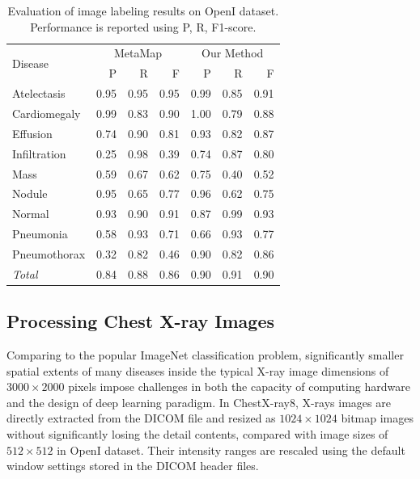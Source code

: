 \documentclass[10pt,twocolumn,letterpaper]{article}
\begin{document}
%
\begin{table}
	\begin{center}
		\begin{tabular}{lr@{~/~}r@{~/~}rr@{~/~}r@{~/~}r}
			\hline
			\multirow{2}{*}{Disease} & \multicolumn{3}{c}{MetaMap} & \multicolumn{3}{c}{Our Method}\\\cline{2-7}
			& P & R & F & P & R & F\\\hline\hline
			Atelectasis & 0.95 & 0.95 & 0.95 & 0.99 & 0.85 & 0.91\\
			Cardiomegaly & 0.99 & 0.83 & 0.90 & 1.00 & 0.79 & 0.88\\
			Effusion & 0.74 & 0.90 & 0.81 & 0.93 & 0.82 & 0.87\\
			Infiltration & 0.25 & 0.98 & 0.39 & 0.74 & 0.87 & 0.80\\
			Mass & 0.59 & 0.67 & 0.62 & 0.75 & 0.40 & 0.52\\
			Nodule & 0.95 & 0.65 & 0.77 & 0.96 & 0.62 & 0.75\\
			Normal & 0.93 & 0.90 & 0.91 & 0.87 & 0.99 & 0.93\\
			Pneumonia & 0.58 & 0.93 & 0.71 & 0.66 & 0.93 & 0.77\\
			Pneumothorax & 0.32 & 0.82 & 0.46 & 0.90 & 0.82 & 0.86\\
			\hspace*{1em}\textit{Total} & 0.84 & 0.88 & 0.86 & 0.90 & 0.91 & 0.90\\
			\hline
		\end{tabular}
	\end{center}
	\caption{Evaluation of image labeling results on OpenI dataset. Performance is reported using P, R, F1-score.}
	\label{tab:evaluation of openi}
\end{table}

\subsection{Processing Chest X-ray Images}
Comparing to the popular ImageNet classification problem, significantly smaller spatial extents of many diseases inside the typical X-ray image dimensions of $3000 \times 2000$ pixels impose challenges in both the capacity of computing hardware and the design of deep learning paradigm. In ChestX-ray8, X-rays images are directly extracted from the DICOM file and resized as $1024\times 1024$ bitmap images without significantly losing the detail contents, compared with image sizes of $512\times 512$ in OpenI dataset. Their intensity ranges are rescaled using the default window settings stored in the DICOM header files. %
\end{document}
